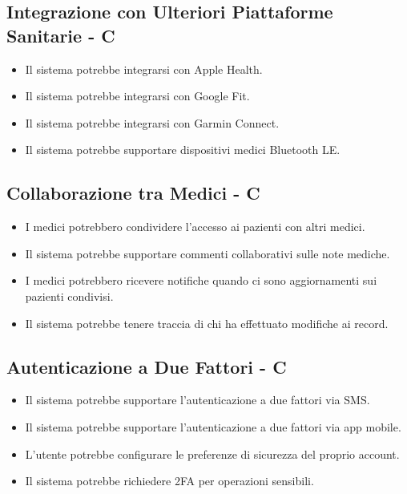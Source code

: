 \documentclass[12pt,a4paper,oneside]{report}
\begin{document}
\subsection{Integrazione con Ulteriori Piattaforme Sanitarie - C}

\begin{itemize}
    \item Il sistema potrebbe integrarsi con Apple Health.
    \item Il sistema potrebbe integrarsi con Google Fit.
    \item Il sistema potrebbe integrarsi con Garmin Connect.
    \item Il sistema potrebbe supportare dispositivi medici Bluetooth LE.
\end{itemize}

\subsection{Collaborazione tra Medici  - C}

\begin{itemize}
    \item I medici potrebbero condividere l'accesso ai pazienti con altri medici.
    \item Il sistema potrebbe supportare commenti collaborativi sulle note mediche.
    \item I medici potrebbero ricevere notifiche quando ci sono aggiornamenti sui pazienti condivisi.
    \item Il sistema potrebbe tenere traccia di chi ha effettuato modifiche ai record.
\end{itemize}

\subsection{Autenticazione a Due Fattori  - C}

\begin{itemize}
    \item Il sistema potrebbe supportare l'autenticazione a due fattori via SMS.
    \item Il sistema potrebbe supportare l'autenticazione a due fattori via app mobile.
    \item L'utente potrebbe configurare le preferenze di sicurezza del proprio account.
    \item Il sistema potrebbe richiedere 2FA per operazioni sensibili.
\end{itemize}
\end{document}
